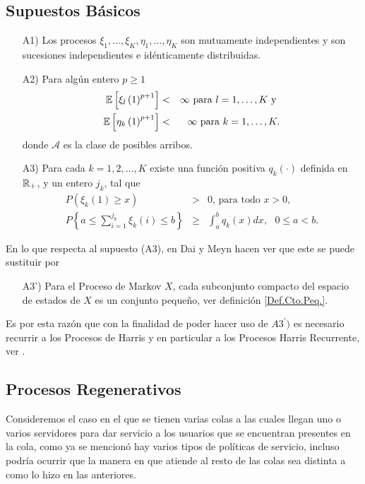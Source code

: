 \subsection{Supuestos B\'asicos}
\begin{itemize}
\item[A1)] Los procesos
$\xi_{1},\ldots,\xi_{K},\eta_{1},\ldots,\eta_{K}$ son mutuamente
independientes y son sucesiones independientes e id\'enticamente
distribuidas.

\item[A2)] Para alg\'un entero $p\geq1$
\begin{eqnarray*}
\mathbb{E}\left[\xi_{l}\left(1\right)^{p+1}\right]&<&\infty\textrm{ para }l=1,\ldots,K\textrm{ y }\\
\mathbb{E}\left[\eta_{k}\left(1\right)^{p+1}\right]&<&\infty\textrm{
para }k=1,\ldots,K.
\end{eqnarray*}
donde $\mathcal{A}$ es la clase de posibles arribos.

\item[A3)] Para cada $k=1,2,\ldots,K$ existe una funci\'on
positiva $q_{k}\left(\cdot\right)$ definida en $\mathbb{R}_{+}$, y un
entero $j_{k}$, tal que
\begin{eqnarray}
P\left(\xi_{k}\left(1\right)\geq x\right)&>&0\textrm{, para todo }x>0,\\
P\left\{a\leq\sum_{i=1}^{j_{k}}\xi_{k}\left(i\right)\leq
b\right\}&\geq&\int_{a}^{b}q_{k}\left(x\right)dx, \textrm{ }0\leq
a<b.
\end{eqnarray}
\end{itemize}

En lo que respecta al supuesto (A3), en Dai y Meyn \cite{DaiSean}
hacen ver que este se puede sustituir por

\begin{itemize}
\item[A3')] Para el Proceso de Markov $X$, cada subconjunto
compacto del espacio de estados de $X$ es un conjunto peque\~no,
ver definici\'on \ref{Def.Cto.Peq.}.
\end{itemize}

Es por esta raz\'on que con la finalidad de poder hacer uso de
$A3^{'})$ es necesario recurrir a los Procesos de Harris y en
particular a los Procesos Harris Recurrente, ver \cite{Dai,
DaiSean}.



%
\subsection{Procesos Regenerativos}
Consideremos el caso en el que se tienen varias colas a las cuales
llegan uno o varios servidores para dar servicio a los usuarios
que se encuentran presentes en la cola, como ya se mencion\'o hay
varios tipos de pol\'iticas de servicio, incluso podr\'ia ocurrir
que la manera en que atiende al resto de las colas sea distinta a
como lo hizo en las anteriores.\\

